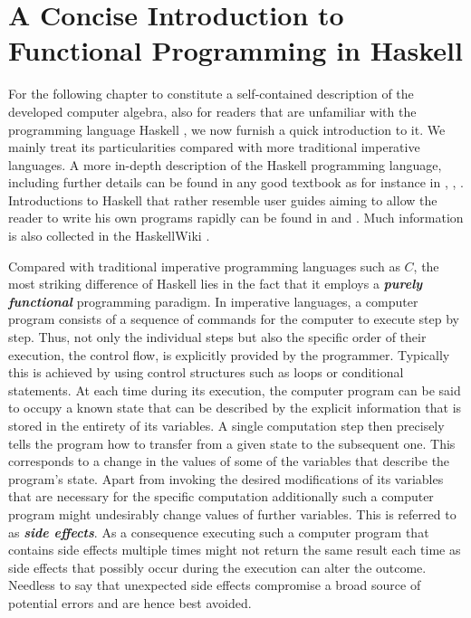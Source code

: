 
\section{A Concise Introduction to Functional Programming in Haskell}
For the following chapter to constitute a self-contained description of the developed computer algebra, also for readers that are unfamiliar with the programming language Haskell \cite{Marlow_haskell2010}, we now furnish a quick introduction to it. We mainly treat its particularities compared with more traditional imperative languages.
A more in-depth description of the Haskell programming language, including 
further details can be found in any good textbook as for instance in \cite{Thompson99thecraft}, \cite{bird_2014}, \cite{hutton_2007}. Introductions to Haskell that rather resemble user guides aiming to allow the reader to write his own programs rapidly can be found in  \cite{OSullivan2008} and  \cite{Lipovaca:2011:LYH:2018642}. Much information is also collected in the HaskellWiki \cite{wiki:xxx}.

Compared with traditional imperative programming languages such as $C$, the most striking difference of Haskell lies in the fact that it employs a \textbf{\textit{purely functional}} programming paradigm. In imperative languages, a computer program consists of a sequence of commands for the computer to execute step by step. Thus, not only the individual steps but also the specific order of their execution, the control flow, is explicitly provided by the programmer. Typically this is achieved by using control structures such as loops or conditional statements. At each time during its execution, the computer program can be said to occupy a known state that can be described by the explicit information that is stored in the entirety of its variables. A single computation step then precisely tells the program how to transfer from a given state to the subsequent one. This corresponds to a change in the values of some of the variables that describe the program's state. Apart from invoking the desired modifications of its variables that are necessary for the specific computation additionally such a computer program might undesirably change values of further variables. This is referred to as \textit{\textbf{side effects}}. As a consequence executing such a computer program that contains side effects multiple times might not return the same result each time as side effects that possibly occur during the execution can alter the outcome. Needless to say that unexpected side effects compromise a broad source of potential errors and are hence best avoided.

